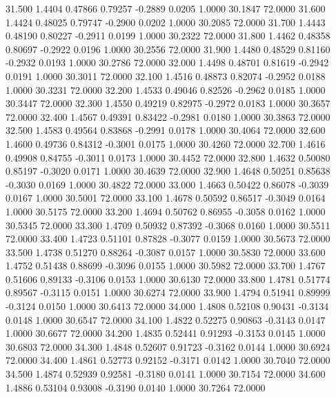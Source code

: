   31.500   1.4404   0.47866   0.79257  -0.2889   0.0205   1.0000  30.1847  72.0000
  31.600   1.4424   0.48025   0.79747  -0.2900   0.0202   1.0000  30.2085  72.0000
  31.700   1.4443   0.48190   0.80227  -0.2911   0.0199   1.0000  30.2322  72.0000
  31.800   1.4462   0.48358   0.80697  -0.2922   0.0196   1.0000  30.2556  72.0000
  31.900   1.4480   0.48529   0.81160  -0.2932   0.0193   1.0000  30.2786  72.0000
  32.000   1.4498   0.48701   0.81619  -0.2942   0.0191   1.0000  30.3011  72.0000
  32.100   1.4516   0.48873   0.82074  -0.2952   0.0188   1.0000  30.3231  72.0000
  32.200   1.4533   0.49046   0.82526  -0.2962   0.0185   1.0000  30.3447  72.0000
  32.300   1.4550   0.49219   0.82975  -0.2972   0.0183   1.0000  30.3657  72.0000
  32.400   1.4567   0.49391   0.83422  -0.2981   0.0180   1.0000  30.3863  72.0000
  32.500   1.4583   0.49564   0.83868  -0.2991   0.0178   1.0000  30.4064  72.0000
  32.600   1.4600   0.49736   0.84312  -0.3001   0.0175   1.0000  30.4260  72.0000
  32.700   1.4616   0.49908   0.84755  -0.3011   0.0173   1.0000  30.4452  72.0000
  32.800   1.4632   0.50080   0.85197  -0.3020   0.0171   1.0000  30.4639  72.0000
  32.900   1.4648   0.50251   0.85638  -0.3030   0.0169   1.0000  30.4822  72.0000
  33.000   1.4663   0.50422   0.86078  -0.3039   0.0167   1.0000  30.5001  72.0000
  33.100   1.4678   0.50592   0.86517  -0.3049   0.0164   1.0000  30.5175  72.0000
  33.200   1.4694   0.50762   0.86955  -0.3058   0.0162   1.0000  30.5345  72.0000
  33.300   1.4709   0.50932   0.87392  -0.3068   0.0160   1.0000  30.5511  72.0000
  33.400   1.4723   0.51101   0.87828  -0.3077   0.0159   1.0000  30.5673  72.0000
  33.500   1.4738   0.51270   0.88264  -0.3087   0.0157   1.0000  30.5830  72.0000
  33.600   1.4752   0.51438   0.88699  -0.3096   0.0155   1.0000  30.5982  72.0000
  33.700   1.4767   0.51606   0.89133  -0.3106   0.0153   1.0000  30.6130  72.0000
  33.800   1.4781   0.51774   0.89567  -0.3115   0.0151   1.0000  30.6274  72.0000
  33.900   1.4794   0.51941   0.89999  -0.3124   0.0150   1.0000  30.6413  72.0000
  34.000   1.4808   0.52108   0.90431  -0.3134   0.0148   1.0000  30.6547  72.0000
  34.100   1.4822   0.52275   0.90863  -0.3143   0.0147   1.0000  30.6677  72.0000
  34.200   1.4835   0.52441   0.91293  -0.3153   0.0145   1.0000  30.6803  72.0000
  34.300   1.4848   0.52607   0.91723  -0.3162   0.0144   1.0000  30.6924  72.0000
  34.400   1.4861   0.52773   0.92152  -0.3171   0.0142   1.0000  30.7040  72.0000
  34.500   1.4874   0.52939   0.92581  -0.3180   0.0141   1.0000  30.7154  72.0000
  34.600   1.4886   0.53104   0.93008  -0.3190   0.0140   1.0000  30.7264  72.0000
